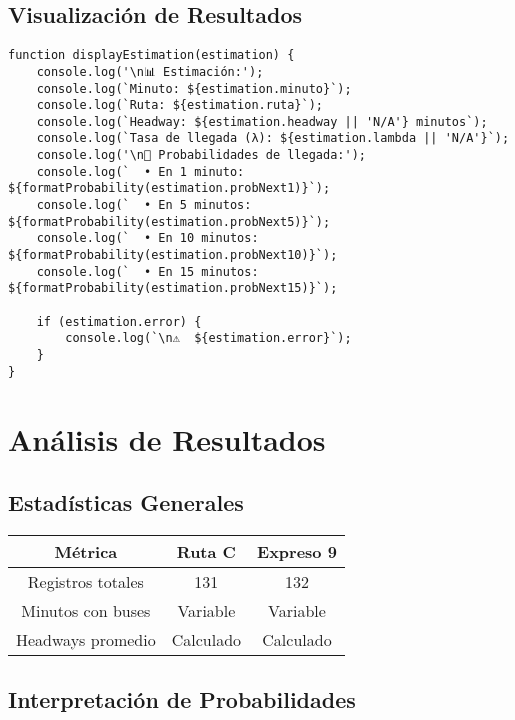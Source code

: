 \documentclass[12pt,a4paper]{article}
\begin{document}
\subsection{Visualización de Resultados}

\begin{lstlisting}[caption=Función de visualización]
function displayEstimation(estimation) {
    console.log('\n📊 Estimación:');
    console.log(`Minuto: ${estimation.minuto}`);
    console.log(`Ruta: ${estimation.ruta}`);
    console.log(`Headway: ${estimation.headway || 'N/A'} minutos`);
    console.log(`Tasa de llegada (λ): ${estimation.lambda || 'N/A'}`);
    console.log('\n🚌 Probabilidades de llegada:');
    console.log(`  • En 1 minuto:  ${formatProbability(estimation.probNext1)}`);
    console.log(`  • En 5 minutos: ${formatProbability(estimation.probNext5)}`);
    console.log(`  • En 10 minutos: ${formatProbability(estimation.probNext10)}`);
    console.log(`  • En 15 minutos: ${formatProbability(estimation.probNext15)}`);
    
    if (estimation.error) {
        console.log(`\n⚠️  ${estimation.error}`);
    }
}
\end{lstlisting}

\section{Análisis de Resultados}

\subsection{Estadísticas Generales}

\begin{center}
\begin{tabular}{|c|c|c|}
\hline
\textbf{Métrica} & \textbf{Ruta C} & \textbf{Expreso 9} \\
\hline
Registros totales & 131 & 132 \\
Minutos con buses & Variable & Variable \\
Headways promedio & Calculado & Calculado \\
\hline
\end{tabular}
\end{center}

\subsection{Interpretación de Probabilidades}
\end{document}
